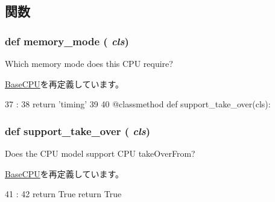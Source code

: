 \subsection{関数}
\hypertarget{classTimingSimpleCPU_1_1TimingSimpleCPU_a53d73a2f804df6a1dcabb22052d09773}{
\subsubsection[{memory\_\-mode}]{\setlength{\rightskip}{0pt plus 5cm}def memory\_\-mode ( {\em cls})}}
\label{classTimingSimpleCPU_1_1TimingSimpleCPU_a53d73a2f804df6a1dcabb22052d09773}
\begin{DoxyVerb}Which memory mode does this CPU require?\end{DoxyVerb}
 

\hyperlink{classBaseCPU_1_1BaseCPU_a53d73a2f804df6a1dcabb22052d09773}{BaseCPU}を再定義しています。


\begin{DoxyCode}
37                         :
38         return 'timing'
39 
40     @classmethod
    def support_take_over(cls):
\end{DoxyCode}
\hypertarget{classTimingSimpleCPU_1_1TimingSimpleCPU_aa201537acf29724056129b8efad43371}{
\subsubsection[{support\_\-take\_\-over}]{\setlength{\rightskip}{0pt plus 5cm}def support\_\-take\_\-over ( {\em cls})}}
\label{classTimingSimpleCPU_1_1TimingSimpleCPU_aa201537acf29724056129b8efad43371}
\begin{DoxyVerb}Does the CPU model support CPU takeOverFrom?\end{DoxyVerb}
 

\hyperlink{classBaseCPU_1_1BaseCPU_aa201537acf29724056129b8efad43371}{BaseCPU}を再定義しています。


\begin{DoxyCode}
41                               :
42         return True
        return True
\end{DoxyCode}


